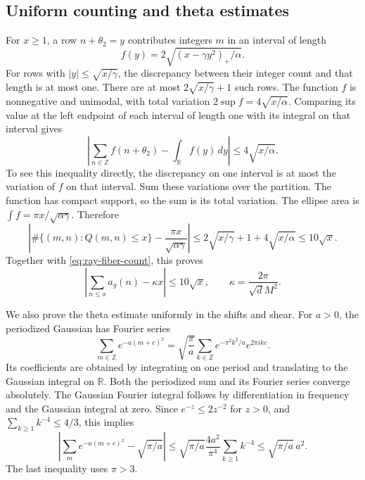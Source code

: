 \subsection{Uniform counting and theta estimates}

For \(x\geq1\), a row \(n+\theta_2=y\) contributes integers \(m\)
in an interval of length
\[
                 f(y)=2\sqrt{(x-\gamma y^2)_+/\alpha}.
\]
For rows with \(|y|\leq\sqrt{x/\gamma}\), the discrepancy between
their integer count and that length is at most one.
There are at most \(2\sqrt{x/\gamma}+1\) such rows.
The function \(f\) is nonnegative and unimodal, with total variation
\(2\sup f=4\sqrt{x/\alpha}\).
Comparing its value at the left endpoint of each interval of length
one with its integral on that interval gives
\[
       \left|\sum_{n\in\mathbb Z}f(n+\theta_2)
                              -\int_{\mathbb R}f(y)\,dy\right|
                           \leq4\sqrt{x/\alpha}.
\]
To see this inequality directly, the discrepancy on one interval is
at most the variation of \(f\) on that interval. Sum these variations
over the partition. The function has compact support, so the sum is
its total variation.
The ellipse area is
\(\int f=\pi x/\sqrt{\alpha\gamma}\). Therefore
\[
 \left|\#\{(m,n):Q(m,n)\leq x\}
                         -\frac{\pi x}{\sqrt{\alpha\gamma}}\right|
 \leq2\sqrt{x/\gamma}+1+4\sqrt{x/\alpha}
                                  \leq10\sqrt x.
\]
Together with \eqref{eq:ray-fiber-count}, this proves
\begin{equation}
 \label{eq:ray-count-done}
 \left|\sum_{n\leq x}a_g(n)-\kappa x\right|\leq10\sqrt x,
                        \qquad \kappa=\frac{2\pi}{\sqrt d M^2}.
\end{equation}

We also prove the theta estimate uniformly in the shifts and shear.
For \(a>0\), the periodized Gaussian has Fourier series
\[
 \sum_{m\in\mathbb Z}e^{-a(m+c)^2}
       =\sqrt{\frac{\pi}{a}}\sum_{k\in\mathbb Z}
                         e^{-\pi^2k^2/a}e^{2\pi ikc}.
\]
Its coefficients are obtained by integrating on one period and
translating to the Gaussian integral on \(\mathbb R\).
Both the periodized sum and its Fourier series converge absolutely.
The Gaussian Fourier integral follows by differentiation in frequency
and the Gaussian integral at zero.
Since \(e^{-z}\leq2z^{-2}\) for \(z>0\), and
\(\sum_{k\geq1}k^{-4}\leq4/3\), this implies
\[
 \left|\sum_me^{-a(m+c)^2}-\sqrt{\pi/a}\right|
   \leq\sqrt{\pi/a}\frac{4a^2}{\pi^4}\sum_{k\geq1}k^{-4}
   \leq\sqrt{\pi/a}\,a^2 .
\]
The last inequality uses \(\pi>3\).

